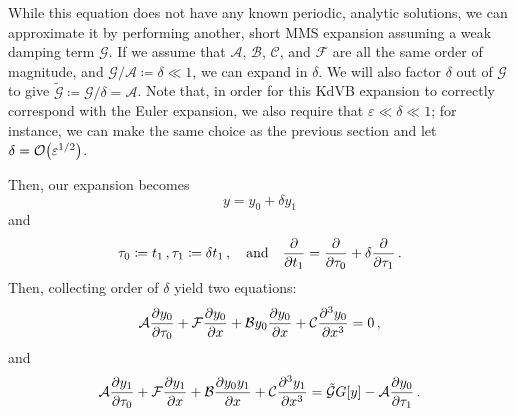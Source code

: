 \documentclass{jfm}
\renewcommand*{\epsilon}{\varepsilon}
\begin{document}
While this equation does not have any known periodic, analytic
solutions, we can approximate it by performing another, short MMS
expansion assuming a weak damping term $\mathcal{G}$.
If we assume that $\mathcal{A}$, $\mathcal{B}$, $\mathcal{C}$, and
$\mathcal{F}$ are all the same order of magnitude, and
$\mathcal{G}/\mathcal{A} \coloneqq \delta \ll 1$, we can expand in
$\delta$.
We will also factor $\delta$ out of $\mathcal{G}$ to give
$\mathcal{\tilde{G}} \coloneqq \mathcal{G}/\delta = \mathcal{A}$.
Note that, in order for this KdVB expansion to correctly correspond with
the Euler expansion, we also require that $\epsilon \ll \delta \ll 1$;
for instance, we can make the same choice as the previous section and
let $\delta = \order{\epsilon^{1/2}}$.

Then, our expansion becomes
\begin{equation}
  y = y_0 + \delta y_1
\end{equation}
and
\begin{equation}
  \tau_0 \coloneqq t_1 \,, \tau_1 \coloneqq \delta t_1 \,, \qq{and}
  \pdv{t_1} = \pdv{\tau_0} + \delta \pdv{\tau_1} \,.
\end{equation}
Then, collecting order of $\delta$ yield two equations:
\begin{equation}
  \mathcal{A} \pdv{y_0}{\tau_0} + \mathcal{F} \pdv{y_0}{x} + \mathcal{B}
  y_0 \pdv{y_0}{x} + \mathcal{C} \pdv[3]{y_0}{x} = 0  \,,
  \label{eq:kdv}
\end{equation}
and
\begin{equation}
  \mathcal{A} \pdv{y_1}{\tau_0} + \mathcal{F} \pdv{y_1}{x} + \mathcal{B}
  \pdv{y_0 y_1}{x} + \mathcal{C} \pdv[3]{y_1}{x} = \mathcal{\tilde{G}}
  G[y] - \mathcal{A} \pdv{y_0}{\tau_1} \,.
  \label{eq:kdvb_expansion}
\end{equation}
\end{document}

